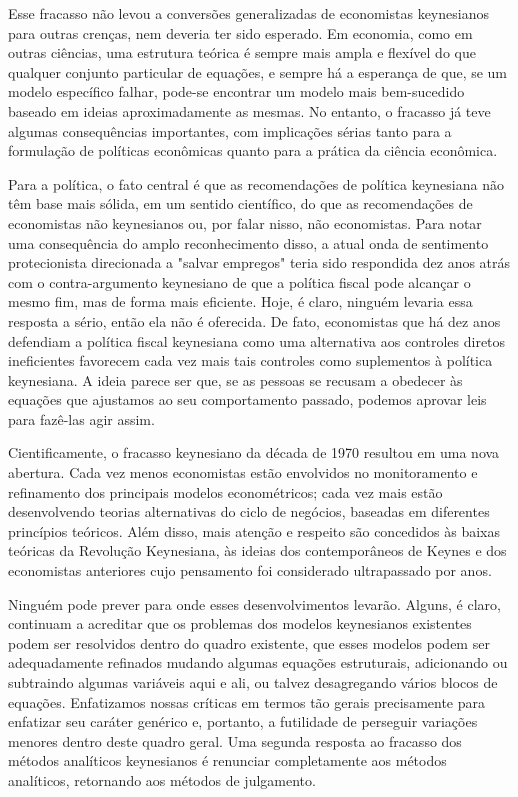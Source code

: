 \documentclass[a4paper,12pt]{article}[abntex2]
\begin{document}
Esse fracasso não levou a conversões generalizadas de economistas keynesianos para outras crenças, nem deveria ter sido esperado. Em economia, como em outras ciências, uma estrutura teórica é sempre mais ampla e flexível do que qualquer conjunto particular de equações, e sempre há a esperança de que, se um modelo específico falhar, pode-se encontrar um modelo mais bem-sucedido baseado em ideias aproximadamente as mesmas. No entanto, o fracasso já teve algumas consequências importantes, com implicações sérias tanto para a formulação de políticas econômicas quanto para a prática da ciência econômica.

Para a política, o fato central é que as recomendações de política keynesiana não têm base mais sólida, em um sentido científico, do que as recomendações de economistas não keynesianos ou, por falar nisso, não economistas. Para notar uma consequência do amplo reconhecimento disso, a atual onda de sentimento protecionista direcionada a "salvar empregos" teria sido respondida dez anos atrás com o contra-argumento keynesiano de que a política fiscal pode alcançar o mesmo fim, mas de forma mais eficiente. Hoje, é claro, ninguém levaria essa resposta a sério, então ela não é oferecida. De fato, economistas que há dez anos defendiam a política fiscal keynesiana como uma alternativa aos controles diretos ineficientes favorecem cada vez mais tais controles como suplementos à política keynesiana. A ideia parece ser que, se as pessoas se recusam a obedecer às equações que ajustamos ao seu comportamento passado, podemos aprovar leis para fazê-las agir assim.

Cientificamente, o fracasso keynesiano da década de 1970 resultou em uma nova abertura. Cada vez menos economistas estão envolvidos no monitoramento e refinamento dos principais modelos econométricos; cada vez mais estão desenvolvendo teorias alternativas do ciclo de negócios, baseadas em diferentes princípios teóricos. Além disso, mais atenção e respeito são concedidos às baixas teóricas da Revolução Keynesiana, às ideias dos contemporâneos de Keynes e dos economistas anteriores cujo pensamento foi considerado ultrapassado por anos.

Ninguém pode prever para onde esses desenvolvimentos levarão. Alguns, é claro, continuam a acreditar que os problemas dos modelos keynesianos existentes podem ser resolvidos dentro do quadro existente, que esses modelos podem ser adequadamente refinados mudando algumas equações estruturais, adicionando ou subtraindo algumas variáveis aqui e ali, ou talvez desagregando vários blocos de equações. Enfatizamos nossas críticas em termos tão gerais precisamente para enfatizar seu caráter genérico e, portanto, a futilidade de perseguir variações menores dentro deste quadro geral. Uma segunda resposta ao fracasso dos métodos analíticos keynesianos é renunciar completamente aos métodos analíticos, retornando aos métodos de julgamento.
\end{document}
